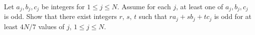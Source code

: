 Let $a_j,b_j,c_j$ be integers for $1\leq j\leq N$.  Assume for each
$j$, at least one of $a_j,b_j,c_j$ is odd.  Show that there exist integers
$r$, $s$, $t$ such that $ra_j+sb_j+tc_j$ is odd for at least $4N/7$ values
of $j$, $1\leq j\leq N$.
